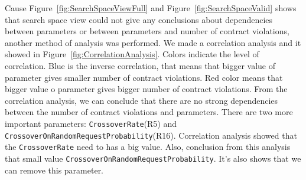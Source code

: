 Cause Figure~\ref{fig:SearchSpaceViewFull} and Figure~\ref{fig:SearchSpaceValid} shows that search space view could not give any conclusions about dependencies between parameters or between parameters and number of contract violations, another method of analysis was performed.
We made a correlation analysis and it showed in Figure~\ref{fig:CorrelationAnalysis}. Colors indicate the level of correlation. Blue is the inverse correlation, that means that bigger value of parameter gives smaller number of contract violations. Red color means that bigger value o parameter gives bigger number of contract violations.
From the correlation analysis, we can conclude that there are no strong dependencies between the number of contract violations and parameters. There are two more important parameters: \texttt{CrossoverRate}(R5) and \texttt{CrossoverOnRandomRequestProbability}(R16).
Correlation analysis showed that the \texttt{CrossoverRate} need to has a big value. Also, conclusion from this analysis that small value  \texttt{CrossoverOnRandomRequestProbability}. It's also shows that we can remove this parameter. 

